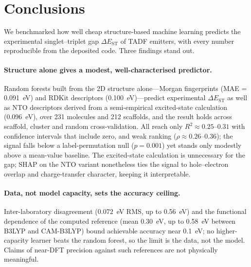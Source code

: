 
\section{Conclusions}\label{sec:conclusions}

We benchmarked how well cheap structure-based machine learning predicts the
experimental singlet--triplet gap $\Delta E_\text{ST}$ of TADF emitters, with every
number reproducible from the deposited code. Three findings stand out.

\paragraph{Structure alone gives a modest, well-characterised predictor.}
Random forests built from the 2D structure alone---Morgan fingerprints
(MAE = \qty{0.091}{\electronvolt}) and RDKit descriptors
(\qty{0.100}{\electronvolt})---predict experimental $\Delta E_\text{ST}$ as well
as NTO descriptors derived from a semi-empirical excited-state calculation
(\qty{0.096}{\electronvolt}), over \num{231} molecules and \num{212} scaffolds, and
the result holds across scaffold, cluster and random cross-validation. All reach only
$R^2 \approx 0.25$--$0.31$ with confidence intervals that include zero, and weak
ranking ($\rho \approx 0.26$--$0.36$); the signal falls below a label-permutation null
($p = 0.001$) yet stands only modestly above a mean-value baseline. The excited-state
calculation is unnecessary for the gap; SHAP on the NTO variant nonetheless ties the
signal to hole--electron overlap and charge-transfer character, keeping it interpretable.

\paragraph{Data, not model capacity, sets the accuracy ceiling.}
Inter-laboratory disagreement (\qty{0.072}{\electronvolt} RMS, up to
\qty{0.56}{\electronvolt}) and the
functional dependence of the computed reference (mean \qty{0.30}{\electronvolt}, up to
\qty{0.58}{\electronvolt} between B3LYP and CAM-B3LYP) bound achievable accuracy near
\qty{0.1}{\electronvolt}; no higher-capacity learner beats the random forest, so the
limit is the data, not the model. Claims of near-DFT precision against such references
are not physically meaningful.

